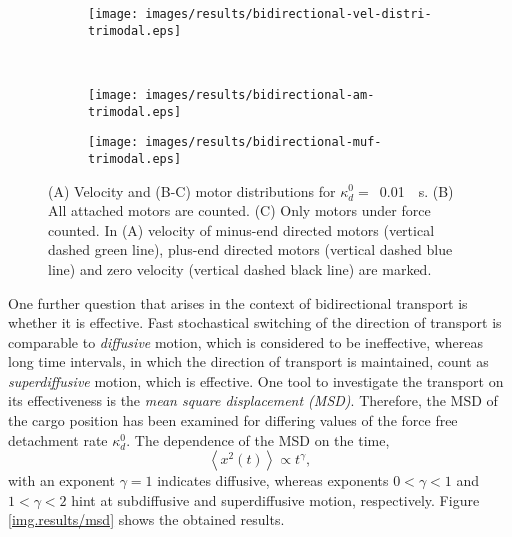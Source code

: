 \renewcommand{\thesubfigure}{\Alph{subfigure}}
\begin{figure}
\centering
\captionsetup[subfigure]{justification=justified,singlelinecheck=false,labelformat=simple}
\begin{subfigure}{0.4\textwidth}
 \subcaption{}
 \texttt{[image: images/results/bidirectional-vel-distri-trimodal.eps]}
\end{subfigure}\\
\begin{subfigure}{0.35\textwidth}
 \subcaption{}
 \texttt{[image: images/results/bidirectional-am-trimodal.eps]}
\end{subfigure}
\begin{subfigure}{0.35\textwidth}
 \subcaption{}
 \texttt{[image: images/results/bidirectional-muf-trimodal.eps]}
\end{subfigure}
\caption[Trimodal velocity distribution and corresponding motor distributions for bidirectional transport]{(A) Velocity and (B-C) motor distributions for \mbox{$\kappa_d^0 =$ \SI{0.01}{\per\second}}. (B) All attached motors are counted. (C) Only motors under force counted. In (A) velocity of minus-end directed motors (vertical dashed green line), plus-end directed motors (vertical dashed blue line) and zero velocity (vertical dashed black line) are marked.} 
\label{img.bimodal-bidirectional-vel-and-motor-distri-for-trimodal-params}
\end{figure}
\renewcommand{\thesubfigure}{\alph{subfigure}}

One further question that arises in the context of bidirectional transport is whether it is effective. Fast stochastical switching of the direction of transport is comparable to
\textit{diffusive} motion, which is considered to be ineffective, whereas long time intervals, in which the direction of transport is maintained, count as \textit{superdiffusive} motion, which is
effective. One tool to investigate the transport on its effectiveness is the \textit{mean square displacement (MSD)}. Therefore, the MSD of the cargo position has been examined for differing values
of the force free detachment rate $\kappa_d^0$. The dependence of the MSD on the time,
\begin{equation}\label{e.msd}
 \left\langle x^2\left(t\right)\right\rangle \propto t^\gamma,
\end{equation}
with an exponent \mbox{$\gamma = 1$} indicates diffusive, whereas exponents \mbox{$0 < \gamma < 1$} and \mbox{$1 < \gamma < 2$} hint at subdiffusive and superdiffusive motion, respectively. Figure
\ref{img.results/msd} shows the obtained results.


